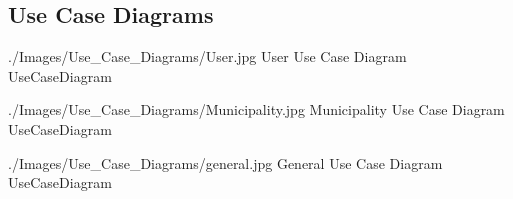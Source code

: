 \documentclass[../../../RASD.tex]{subfiles}
\begin{document}
\subsection{Use Case Diagrams\label{sect:3.2.2}}

\image {9cm} {./Images/Use_Case_Diagrams/User.jpg} {User Use Case Diagram} {UseCaseDiagram}

\image {7cm} {./Images/Use_Case_Diagrams/Municipality.jpg} {Municipality Use Case Diagram} {UseCaseDiagram}

\image {13cm} {./Images/Use_Case_Diagrams/general.jpg} {General Use Case Diagram} {UseCaseDiagram}

\newpage
\end{document}
